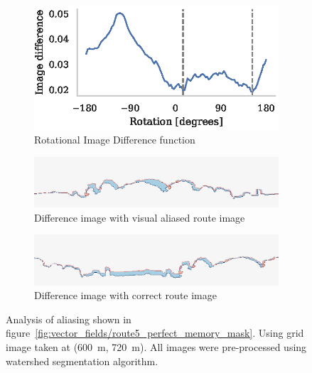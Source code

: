 \documentclass[letterpaper]{article}
\begin{document}
\begin{figure}[t]
    \begin{subfigure}[b]{\columnwidth}
        \includegraphics[width=\columnwidth]{figures/alias_ridf.eps}
        \caption{Rotational Image Difference function}
        \label{fig:aliasing/ridf}
    \end{subfigure}
    
    \begin{subfigure}[b]{\columnwidth}
        \includegraphics[width=\columnwidth]{figures/image_diff_bad.png}
        \caption{Difference image with visual aliased route image}
        \label{fig:aliasing/image_diff_bad}
    \end{subfigure}
    
    \begin{subfigure}[b]{\columnwidth}
        \includegraphics[width=\columnwidth]{figures/image_diff_good.png}
        \caption{Difference image with correct route image}
        \label{fig:aliasing/image_diff_good}
    \end{subfigure}
    \caption{Analysis of aliasing shown in figure~\ref{fig:vector_fields/route5_perfect_memory_mask}.
    Using grid image taken at (\SI{600}{\metre}, \SI{720}{\metre}).
    All images were pre-processed using watershed segmentation algorithm.}
    \label{fig:aliasing}
\end{figure}
\end{document}
